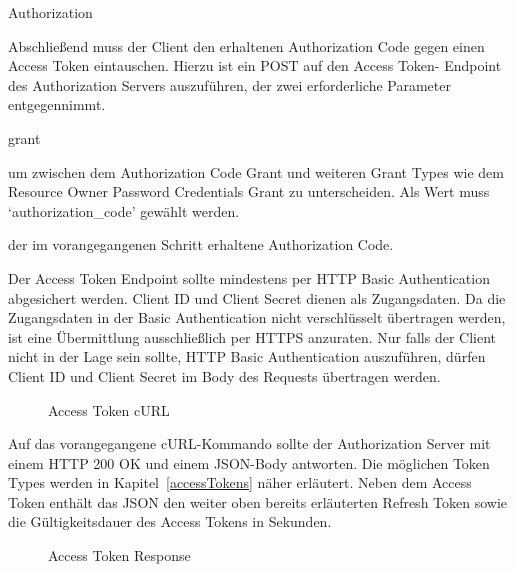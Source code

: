 \begin{labeling}{Authorization}
    \item [Access Token Retrieval (7--8)]
    Abschließend muss der Client den erhaltenen Authorization Code gegen
    einen Access Token eintauschen. Hierzu ist ein POST auf den Access Token-
    Endpoint des Authorization Servers auszuführen, der zwei erforderliche
    Parameter entgegennimmt.

    \begin{labeling}{grant}
        \item [grant\_type] um zwischen dem Authorization Code Grant und
        weiteren Grant Types wie dem Resource Owner Password Credentials Grant
        zu unterscheiden. Als Wert muss `authorization\_code' gewählt werden.
        \item [code] der im vorangegangenen Schritt erhaltene Authorization
        Code.
    \end{labeling}
    Der Access Token Endpoint sollte mindestens per HTTP Basic Authentication
    abgesichert werden. Client ID und Client Secret dienen als Zugangsdaten.
    Da die Zugangsdaten in der Basic Authentication nicht verschlüsselt
    übertragen werden, ist eine Übermittlung ausschließlich per HTTPS anzuraten.
    Nur falls der Client nicht in der Lage sein sollte, HTTP Basic Authentication
    auszuführen, dürfen Client ID und Client Secret im Body des Requests
    übertragen werden.

    \begin{figure}[h]
        \scalebox{.8}{
            
        }
        \caption{Access Token cURL}\label{ls: Access Token cURL}
    \end{figure}

    Auf das vorangegangene cURL-Kommando sollte der Authorization Server mit
    einem HTTP 200 OK und einem JSON-Body antworten. Die möglichen Token Types
    werden in Kapitel~\ref{accessTokens} näher erläutert. Neben dem Access Token
    enthält das JSON den weiter oben bereits erläuterten Refresh Token sowie die
    Gültigkeitsdauer des Access Tokens in Sekunden.

    \begin{figure}[h]
        \scalebox{.8}{
            
        }
        \caption{Access Token Response}\label{ls: Access Token Response}
    \end{figure}

\end{labeling}

